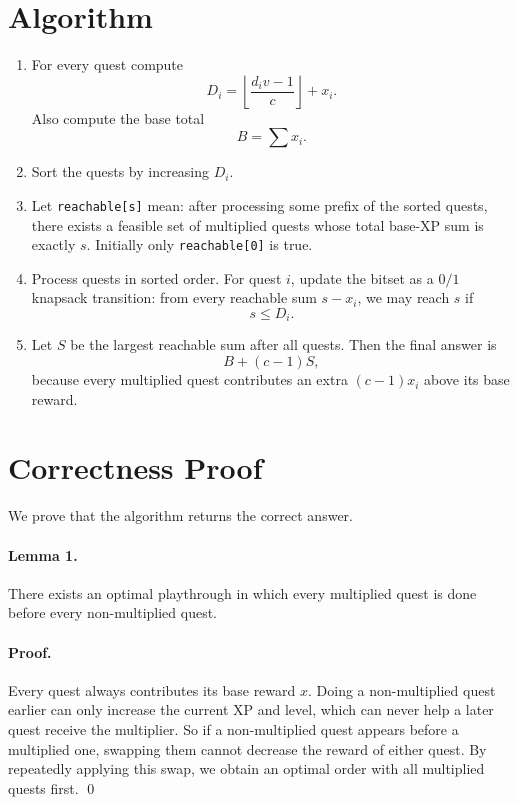\documentclass[11pt]{article}
\begin{document}
\section*{Algorithm}

\begin{enumerate}[leftmargin=*]
    \item For every quest compute
    \[
        D_i = \left\lfloor \frac{d_i v - 1}{c} \right\rfloor + x_i.
    \]
    Also compute the base total
    \[
        B = \sum x_i.
    \]
    \item Sort the quests by increasing $D_i$.
    \item Let \texttt{reachable[s]} mean:
    after processing some prefix of the sorted quests, there exists a feasible set of multiplied quests whose
    total base-XP sum is exactly $s$.
    Initially only \texttt{reachable[0]} is true.
    \item Process quests in sorted order. For quest $i$, update the bitset as a $0/1$ knapsack transition:
    from every reachable sum $s-x_i$, we may reach $s$ if
    \[
        s \le D_i.
    \]
    \item Let $S$ be the largest reachable sum after all quests. Then the final answer is
    \[
        B + (c-1)S,
    \]
    because every multiplied quest contributes an extra $(c-1)x_i$ above its base reward.
\end{enumerate}

\section*{Correctness Proof}

We prove that the algorithm returns the correct answer.

\paragraph{Lemma 1.}
There exists an optimal playthrough in which every multiplied quest is done before every non-multiplied
quest.

\paragraph{Proof.}
Every quest always contributes its base reward $x$.
Doing a non-multiplied quest earlier can only increase the current XP and level, which can never help a
later quest receive the multiplier.
So if a non-multiplied quest appears before a multiplied one, swapping them cannot decrease the reward of
either quest.
By repeatedly applying this swap, we obtain an optimal order with all multiplied quests first. \qed
\end{document}
